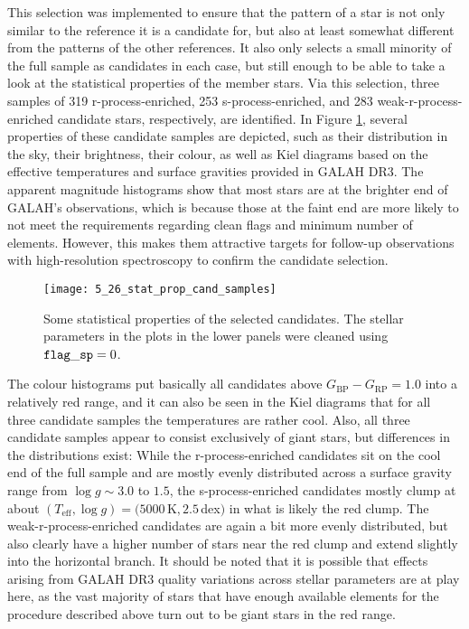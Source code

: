 \documentclass[a4paper,11pt]{article}
\begin{document}
%
This selection was implemented to ensure that the pattern of a star is not only similar to the reference it is a candidate for, but also at least somewhat different from the patterns of the other references. It also only selects a small minority of the full sample as candidates in each case, but still enough to be able to take a look at the statistical properties of the member stars. Via this selection, three samples of 319 r-process-enriched, 253 s-process-enriched, and 283 weak-r-process-enriched candidate stars, respectively, are identified. In Figure \ref{fig:stat_prop_cand_samples}, several properties of these candidate samples are depicted, such as their distribution in the sky, their brightness, their colour, as well as Kiel diagrams based on the effective temperatures and surface gravities provided in GALAH DR3. The apparent magnitude histograms show that most stars are at the brighter end of GALAH's observations, which is because those at the faint end are more likely to not meet the requirements regarding clean flags and minimum number of elements. However, this makes them attractive targets for follow-up observations with high-resolution spectroscopy to confirm the candidate selection.
%
\begin{figure}[H]
 \centering
 \texttt{[image: 5\_26\_stat\_prop\_cand\_samples]}
 \caption[Statistical properties of the selected n-capture process candidates]{Some statistical properties of the selected candidates. The stellar parameters in the plots in the lower panels were cleaned using ${\tt flag\_sp}=0$.}
 \label{fig:stat_prop_cand_samples}
\end{figure}
%
\noindent
The colour histograms put basically all candidates above $G_\mathrm{BP}-G_\mathrm{RP}=1.0$ into a relatively red range, and it can also be seen in the Kiel diagrams that for all three candidate samples the temperatures are rather cool. Also, all three candidate samples appear to consist exclusively of giant stars, but differences in the distributions exist: While the r-process-enriched candidates sit on the cool end of the full sample and are mostly evenly distributed across a surface gravity range from $\log{g}\sim3.0$ to $1.5$, the s-process-enriched candidates mostly clump at about $(T_\mathrm{eff},\log{g})=(5000$\,K$,2.5$\,dex$)$ in what is likely the red clump. The weak-r-process-enriched candidates are again a bit more evenly distributed, but also clearly have a higher number of stars near the red clump and extend slightly into the horizontal branch. It should be noted that it is possible that effects arising from GALAH DR3 quality variations across stellar parameters are at play here, as the vast majority of stars that have enough available elements for the procedure described above turn out to be giant stars in the red range.\\ \\
\end{document}
